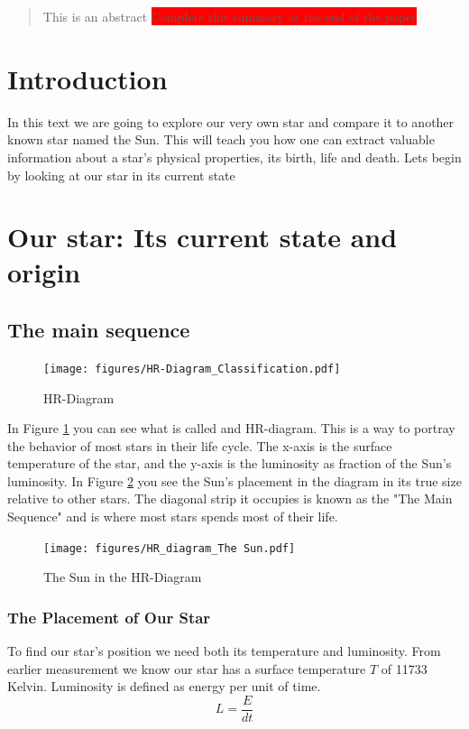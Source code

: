\documentclass[reprint,english,notitlepage]{revtex4-2}
\begin{document}
\title{}
\author{Oskar Idland \& Jannik Eschler}
\date{\today}

\begin{abstract}
    This is an abstract \colorbox{red}{Complete this summary at the end of the paper}
\end{abstract}
\maketitle
\section{Introduction} \label{sec: introduction}
In this text we are going to explore our very own star and compare it to another known star named the Sun. This will teach you how one can extract valuable information about a star's physical properties, its birth, life and death. Lets begin by looking at our star in its current state      

\section{Our star: Its current state and origin}
\subsection{The main sequence}
\begin{figure}[h!]
  \centering
  \texttt{[image: figures/HR-Diagram\_Classification.pdf]}
  \caption{HR-Diagram}
  \label{fig: HR_diagram}
\end{figure}
In Figure \ref{fig: HR_diagram} you can see what is called and HR-diagram. This is a way to portray the behavior of most stars in their life cycle. The x-axis is the surface temperature of the star, and the y-axis is the luminosity as fraction of the Sun's luminosity. In Figure \ref{fig: HR_diagram_The_Sun} you see the Sun's placement in the diagram in its true size relative to other stars. The diagonal strip it occupies is known as the "The Main Sequence" and is where most stars spends most of their life. 

\begin{figure}[h!]
  \centering
  \texttt{[image: figures/HR\_diagram\_The Sun.pdf]}
  \caption{The Sun in the HR-Diagram}
  \label{fig: HR_diagram_The_Sun}
\end{figure}

\subsubsection*{The Placement of Our Star}
To find our star's position we need both its temperature and luminosity. From earlier measurement we know our star has a surface temperature $ T $ of 11733 Kelvin. Luminosity is defined as energy per unit of time. 
\begin{equation} \label{eq: Luminosity}
  L = \frac{E}{dt}
\end{equation}  
\end{document}
